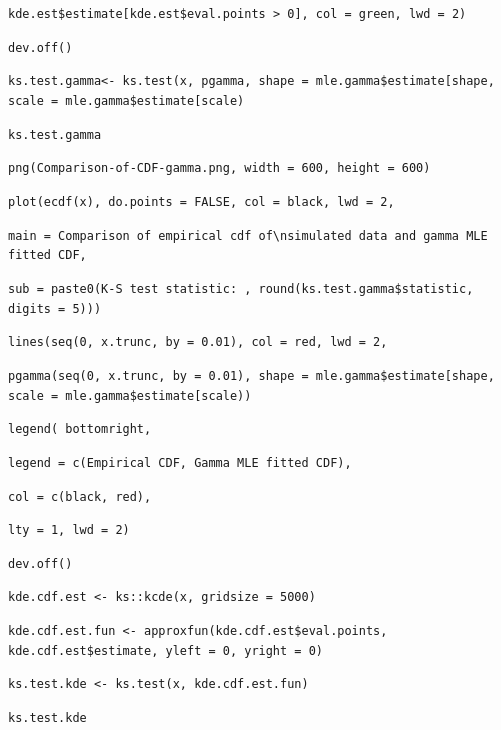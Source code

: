 \documentclass[english]{paper}
\begin{document}
{\begin{minipage}[t]{1\columnwidth - 2\fboxsep - 2\fboxrule}
\texttt{kde.est\$estimate{[}kde.est\$eval.points > 0{]}, col = \textquotedbl green\textquotedbl ,
lwd = 2)}

\texttt{dev.off()}

\texttt{ks.test.gamma<- ks.test(x, pgamma, shape = mle.gamma\$estimate{[}\textquotedbl shape\textquotedbl{]},
scale = mle.gamma\$estimate{[}\textquotedbl scale\textquotedbl{]})}

\texttt{ks.test.gamma}

\texttt{png(\textquotedbl Comparison-of-CDF-gamma.png\textquotedbl ,
width = 600, height = 600)}

\texttt{plot(ecdf(x), do.points = FALSE, col = \textquotedbl black\textquotedbl ,
lwd = 2, }

\texttt{main = \textquotedbl Comparison of empirical cdf of\textbackslash nsimulated
data and gamma MLE fitted CDF\textquotedbl ,}

\texttt{sub = paste0(\textquotedbl K-S test statistic: \textquotedbl ,
round(ks.test.gamma\$statistic, digits = 5))) }

\texttt{lines(seq(0, x.trunc, by = 0.01), col = \textquotedbl red\textquotedbl ,
lwd = 2,}

\texttt{pgamma(seq(0, x.trunc, by = 0.01), shape = mle.gamma\$estimate{[}\textquotedbl shape\textquotedbl{]},
scale = mle.gamma\$estimate{[}\textquotedbl scale\textquotedbl{]}))}

\texttt{legend( \textquotedbl bottomright\textquotedbl ,}

\texttt{legend = c(\textquotedbl Empirical CDF\textquotedbl , \textquotedbl Gamma
MLE fitted CDF\textquotedbl ),}

\texttt{col = c(\textquotedbl black\textquotedbl , \textquotedbl red\textquotedbl ),}

\texttt{lty = 1, lwd = 2)}

\texttt{dev.off()}

\texttt{kde.cdf.est <- ks::kcde(x, gridsize = 5000)}

\texttt{kde.cdf.est.fun <- approxfun(kde.cdf.est\$eval.points, kde.cdf.est\$estimate,
yleft = 0, yright = 0)}

\texttt{ks.test.kde <- ks.test(x, kde.cdf.est.fun)}

\texttt{ks.test.kde}%
\end{minipage}}
\end{document}
